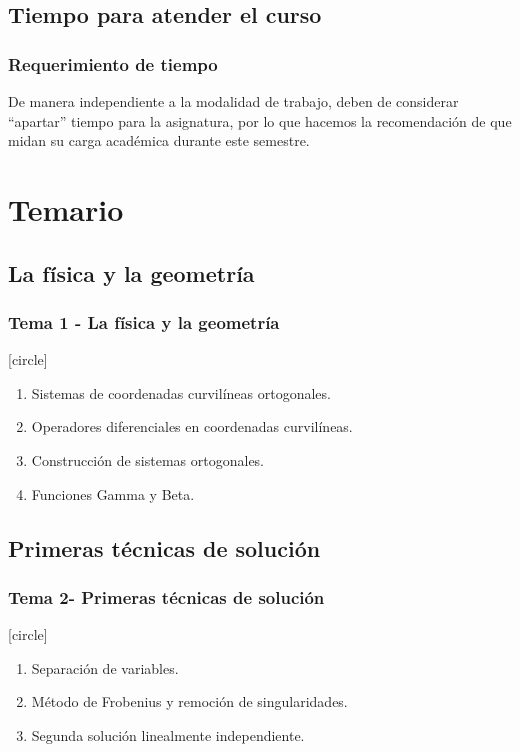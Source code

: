 \subsection{Tiempo para atender el curso}
\begin{frame}
\frametitle{Requerimiento de tiempo}
De manera independiente a la modalidad de trabajo, deben de considerar \enquote{apartar} tiempo para la asignatura, por lo que hacemos la recomendación de que midan su carga académica durante este semestre.
\end{frame}
\section{Temario}
\subsection{La física y la geometría}
\begin{frame}
\frametitle{Tema 1 - La física y la geometría}
[circle]
\begin{enumerate}[<+->]
\item Sistemas de coordenadas curvilíneas ortogonales.
\item Operadores diferenciales en coordenadas curvilíneas.
\item Construcción de sistemas ortogonales.
\item Funciones Gamma y Beta.
\end{enumerate}
\end{frame}
\subsection{Primeras técnicas de solución}
\begin{frame}
\frametitle{Tema 2- Primeras técnicas de solución}
[circle]
\begin{enumerate}[<+->]
\item Separación de variables.
\item Método de Frobenius y remoción de singularidades.
\item Segunda solución linealmente independiente.
\end{enumerate}
\end{frame}
